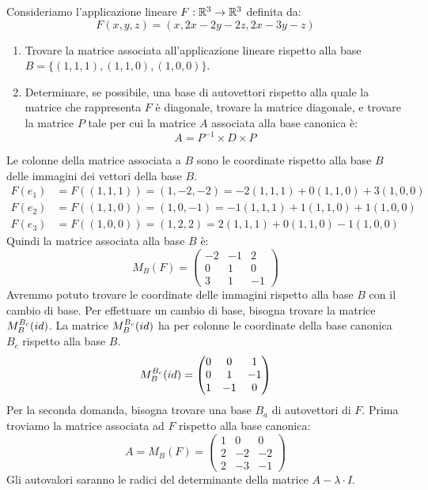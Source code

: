 \begin{exmp}
Consideriamo l'applicazione lineare $F : \mathbb{R}^3 \to \mathbb{R}^3$ definita da:
\[
F(x,y,z) = (x, 2x-2y-2z, 2x-3y-z)
\]
\begin{enumerate}
    \item Trovare la matrice associata all'applicazione lineare rispetto alla base $B = \{ (1,1,1), (1,1,0), (1,0,0) \}$.
    \item Determinare, se possibile, una base di autovettori rispetto alla quale la matrice che rappresenta $F$ \`e diagonale, trovare la matrice diagonale, e trovare la matrice $P$ tale per cui la matrice $A$ associata alla base canonica \`e:
    \[
    A = P^{-1} \times D \times P
    \]
\end{enumerate}
Le colonne della matrice associata a $B$ sono le coordinate rispetto alla base $B$ delle immagini dei vettori della base $B$.
\begin{align*}
F(e_1) &= F((1,1,1)) = (1,-2,-2) = -2 (1,1,1) + 0 (1,1,0) + 3(1,0,0) \\
F(e_2) &= F((1,1,0)) = (1,0,-1) = -1 (1,1,1) + 1 (1,1,0) + 1 (1,0,0) \\
F(e_3) &= F((1,0,0)) = (1,2,2) = 2 (1,1,1) + 0 (1,1,0) - 1 (1,0,0)
\end{align*}
Quindi la matrice associata alla base $B$ \`e:
\[
M_B (F) =
\begin{pmatrix}
-2 & -1 & 2 \\
0 & 1 & 0 \\
3 & 1 & -1
\end{pmatrix}
\]
Avremmo potuto trovare le coordinate delle immagini rispetto alla base $B$ con il cambio di base. Per effettuare un cambio di base, bisogna trovare la matrice $M_{B}^{B_c} (id)$. La matrice $M_{B}^{B_c} (id)$ ha per colonne le coordinate della base canonica $B_c$ rispetto alla base $B$.
\[
M_{B}^{B_c} (id) = 
\begin{pmatrix}
0 & 0 & 1 \\
0 & 1 & -1 \\
1 & -1 & 0
\end{pmatrix}
\]
Per la seconda domanda, bisogna trovare una base $B_a$ di autovettori di $F$. Prima troviamo la matrice associata ad $F$ rispetto alla base canonica:
\[
A = M_{B} (F) =
\begin{pmatrix}
1 & 0 & 0 \\
2 & -2 & -2 \\
2 & -3 & -1
\end{pmatrix}
\]
Gli autovalori saranno le radici del determinante della matrice $A - \lambda \cdot I$.

\end{exmp}
